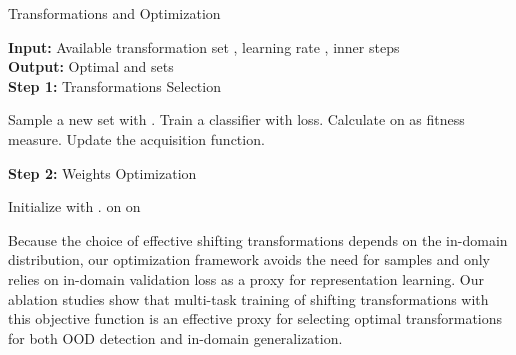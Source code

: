 \documentclass[letterpaper]{article} \usepackage{aaai22}  \usepackage{times}  \usepackage{helvet}  \usepackage{courier}  \usepackage[hyphens]{url}  \usepackage{graphicx} \urlstyle{rm} \def\UrlFont{\rm}  \usepackage{natbib}  \usepackage{caption} \DeclareCaptionStyle{ruled}{labelfont=normalfont,labelsep=colon,strut=off} \frenchspacing  \setlength{\pdfpagewidth}{8.5in}  \setlength{\pdfpageheight}{11in}
\begin{document}
\begin{algorithm}[tb]
\caption{Transformations  and  Optimization}
\label{alg:only_alg}
\textbf{Input:} Available transformation set , learning rate , inner steps   \\
\textbf{Output:} Optimal  and  sets \\
\textbf{Step 1:} Transformations Selection 
\begin{algorithmic}[1] 
        \STATE Sample a new  set with .
        \STATE Train a classifier with  loss.
        \STATE Calculate  on  as fitness measure.
        \STATE Update the acquisition function.
    \ENDWHILE
\end{algorithmic}
\textbf{Step 2:}  Weights Optimization
\begin{algorithmic}[1] 
\STATE Initialize with .
\STATE   on 
    \ENDFOR
    \STATE  on 
\ENDWHILE
\end{algorithmic}
\end{algorithm}







%
 


Because the choice of effective shifting transformations depends on the in-domain distribution, our optimization framework avoids the need for  samples and only relies on in-domain validation loss as a proxy for representation learning. 
Our ablation studies show that multi-task training of shifting transformations with this objective function is an effective proxy for selecting optimal transformations for both OOD detection and in-domain generalization. 
\end{document}
